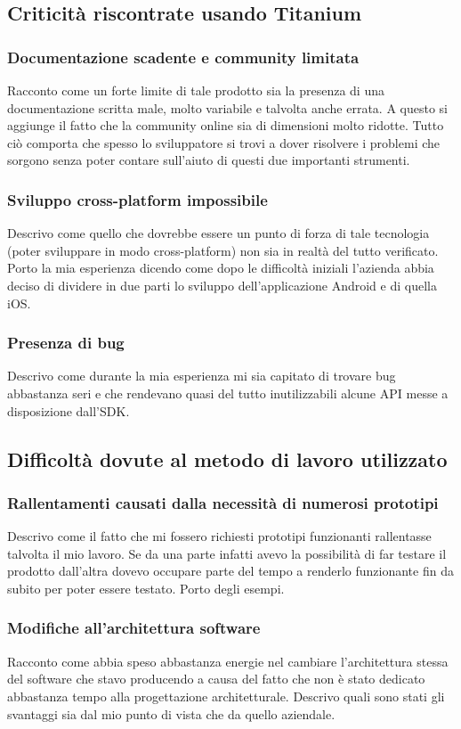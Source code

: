 		\subsection{Criticità riscontrate usando Titanium}
			\subsubsection{Documentazione scadente e community limitata}
				Racconto come un forte limite di tale prodotto sia la presenza di una documentazione scritta male, molto variabile
				e talvolta anche errata. A questo si aggiunge il fatto che la community online sia di dimensioni molto ridotte.
				Tutto ciò comporta che spesso lo sviluppatore si trovi a dover risolvere i problemi che sorgono senza poter contare
				sull'aiuto di questi due importanti strumenti.
			\subsubsection{Sviluppo cross-platform impossibile}
				Descrivo come quello che dovrebbe essere un punto di forza di tale tecnologia (poter sviluppare in modo
				cross-platform) non sia in realtà del tutto verificato. Porto la mia esperienza dicendo come dopo le difficoltà
				iniziali l'azienda abbia deciso di dividere in due parti lo sviluppo dell'applicazione Android e di quella iOS.
			\subsubsection{Presenza di bug}
				Descrivo come durante la mia esperienza mi sia capitato di trovare bug abbastanza seri e che rendevano quasi del
				tutto inutilizzabili alcune API messe a disposizione dall'SDK.
		\subsection{Difficoltà dovute al metodo di lavoro utilizzato}
			\subsubsection{Rallentamenti causati dalla necessità di numerosi prototipi}
				Descrivo come il fatto che mi fossero richiesti prototipi funzionanti rallentasse talvolta il mio lavoro. Se da una
				parte infatti avevo la possibilità di far testare il prodotto dall'altra dovevo occupare parte del tempo a renderlo
				funzionante fin da subito per poter essere testato. Porto degli esempi.
			\subsubsection{Modifiche all'architettura software}
				Racconto come abbia speso abbastanza energie nel cambiare l'architettura stessa del software che stavo producendo
				a causa del fatto che non è stato dedicato abbastanza tempo alla progettazione architetturale. Descrivo quali sono
				stati gli svantaggi sia dal mio punto di vista che da quello aziendale.
